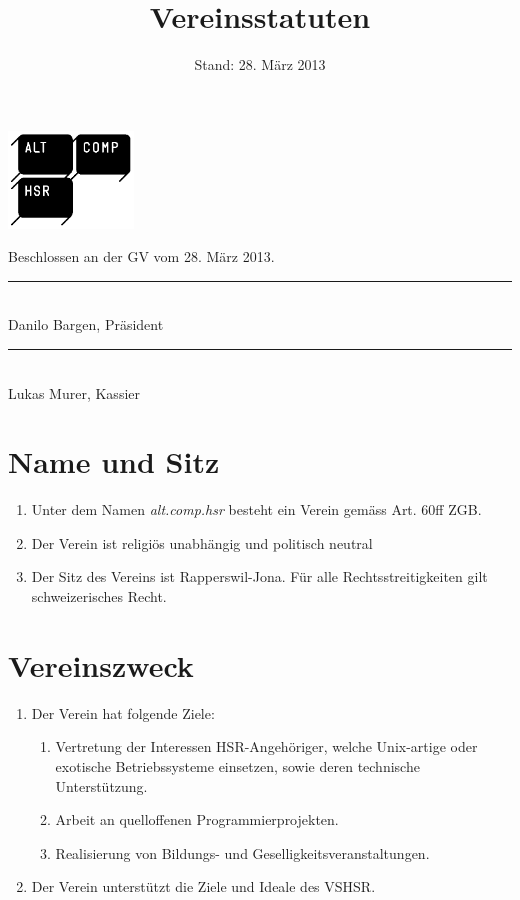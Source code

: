 \documentclass[10pt,a4paper,parskip,fleqn]{scrartcl}
\title{\Huge Vereinsstatuten}
\date{Stand: 28. März 2013}
\newcommand{\ol}{\begin{enumerate}[itemsep=-0.2em,topsep=-0.2em]}
\newcommand{\lo}{\end{enumerate}}
\newcommand{\li}{\item}
\begin{document}
\begin{titlepage}
  \maketitle
  \thispagestyle{empty} %
  \begin{center}
    \includegraphics[width=0.25\textwidth]{logo.png}\\

    \vfill

    \large Beschlossen an der GV vom 28. März 2013.

    \vspace{1.5cm}

    \begin{minipage}[t]{0.49\textwidth}
      \center
      \rule{5cm}{0.2mm}\\
      Danilo Bargen, Präsident
    \end{minipage}
    \begin{minipage}[t]{0.49\textwidth}
      \center
      \rule{5cm}{0.2mm}\\
      Lukas Murer, Kassier
    \end{minipage}
  \end{center}
\end{titlepage}


\section{Name und Sitz}

\ol
  \li Unter dem Namen \textit{alt.comp.hsr} besteht ein Verein gemäss Art. 60ff
  ZGB.
  \li Der Verein ist religiös unabhängig und politisch neutral
  \li Der Sitz des Vereins ist Rapperswil-Jona. Für alle Rechtsstreitigkeiten
  gilt schweizerisches Recht.
\lo


\section{Vereinszweck}

\ol
  \li Der Verein hat folgende Ziele:
    \ol
      \li Vertretung der Interessen HSR-Angehöriger, welche Unix-artige oder
      exotische Betriebssysteme einsetzen, sowie deren technische Unterstützung.
      \li Arbeit an quelloffenen Programmierprojekten.
      \li Realisierung von Bildungs- und Geselligkeitsveranstaltungen.
    \lo
  \li Der Verein unterstützt die Ziele und Ideale des VSHSR. 
\lo
\end{document}
